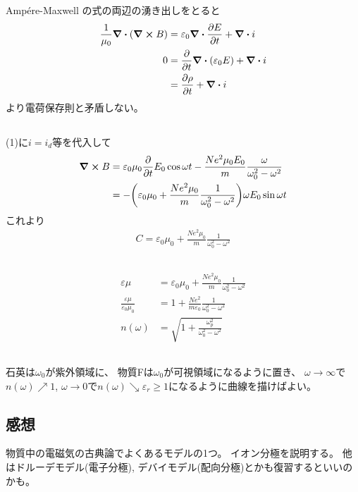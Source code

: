 \documentclass[../../master.tex]{subfiles}
\begin{document}
\subsection{}
Amp\'{e}re-Maxwell の式の両辺の湧き出しをとると
\begin{align}
    \frac{1}{\mu_0}\div(\curl B) &= \varepsilon_0 \div \pdv{E}{t} + \div i\\
    0 &= \pdv{t}\div(\varepsilon_0 E) + \div i\\
    &= \pdv{\rho}{t} +\div i
\end{align}
より電荷保存則と矛盾しない。

\subsection{}
(1)に\(i=i_d\)等を代入して
\begin{align}
    \curl B
    &= \varepsilon_0\mu_0\pdv{t}E_0\cos\omega t -\frac{Ne^2\mu_0E_0}{m}\frac{\omega}{\omega_0^2-\omega^2}\\
    &= -\qty(\varepsilon_0\mu_0+\frac{Ne^2\mu_0}{m}\frac{1}{\omega_0^2-\omega^2})\omega E_0\sin\omega t
\end{align}
これより
\begin{align}
    C = \varepsilon_0\mu_0+\frac{Ne^2\mu_0}{m}\frac{1}{\omega_0^2-\omega^2}
\end{align}

\subsection{}
\begin{align}
    \varepsilon\mu &= \varepsilon_0\mu_0+\frac{Ne^2\mu_0}{m}\frac{1}{\omega_0^2-\omega^2}\\
    \frac{\varepsilon\mu}{\varepsilon_0\mu_0} &= 1+\frac{Ne^2}{m\varepsilon_0}\frac{1}{\omega_0^2-\omega^2}\\
    n(\omega) &= \sqrt{1+\frac{\omega_p^2}{\omega_0^2-\omega^2}}
\end{align}

\subsection{}
石英は\(\omega_0\)が紫外領域に、
物質Fは\(\omega_0\)が可視領域になるように置き、
\(\omega\to\infty\)で\(n(\omega)\nearrow 1\),
\(\omega\to 0\)で\(n(\omega)\searrow \varepsilon_r \ge 1\)になるように曲線を描けばよい。

\subsection*{感想}
物質中の電磁気の古典論でよくあるモデルの1つ。
イオン分極を説明する。
他はドルーデモデル(電子分極), デバイモデル(配向分極)とかも復習するといいのかも。
\end{document}
